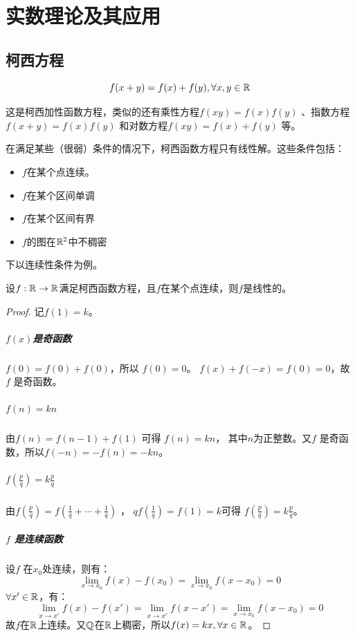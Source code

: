 \chapter{实数理论及其应用}

\section{柯西方程}
\begin{definition}[柯西函数方程]
    \[f(x+y)=f(x)+f(y), \forall x,y \in \mathbb{R}
    \]
\end{definition}

这是柯西加性函数方程，类似的还有乘性方程\(f(xy) = f(x)f(y)\) 、指数方程\(f(x+y) = f(x)f(y)\)
和对数方程\(f(xy) = f(x) + f(y)\) 等。

在满足某些（很弱）条件的情况下，柯西函数方程只有线性解。这些条件包括：
\begin{itemize}
    \item \(f\)在某个点连续。
    \item \(f\)在某个区间单调
    \item \(f\)在某个区间有界
    \item \(f\)的图在\(\mathbb{R}^2\)中不稠密
\end{itemize}

下以连续性条件为例。

\begin{theorem}
    设\(f:\mathbb{R} \to \mathbb{R}\)满足柯西函数方程，且\(f\)在某个点连续，则\(f\)是线性的。
\end{theorem}

\begin{proof}
    记\(f(1)=k\)。
    \paragraph*{\(f(x)\)是奇函数} \(f(0) = f(0) + f(0)\)，所以 \(f(0) = 0\)。
    \(f(x) + f(-x) = f(0) = 0\)，故\(f\) 是奇函数。
    \paragraph*{\(f(n)=kn\)} 由\(f(n) = f(n-1) + f(1)\) 可得 \(f(n) = kn\)，
    其中\(n\)为正整数。又\(f\) 是奇函数，所以\(f(-n) = -f(n) = -kn\)。
    \paragraph*{\(f\left( \frac{p}{q} \right) = k \frac{p}{q}\)}
    由\(f\left( \frac{p}{q} \right)
    = f\left( \frac{1}{q} + \cdots + \frac{1}{q} \right)\) ，
    \(qf\left( \frac{1}{q} \right)= f(1) = k\)可得
    \(f\left( \frac{p}{q} \right) = k
    \frac{p}{q}\)。
    \paragraph*{\(f\) 是连续函数} 设\(f\) 在\(x_0\)处连续，则有：\[
        \lim_{x \to x_0} f(x)-f(x_{0}) = \lim_{x \to x_0} f(x-x_0) =0
    \]
    \(\forall x' \in \mathbb{R}\)，有：\[
        \lim_{x \to x'} f(x)-f(x') = \lim_{x \to x'} f(x-x') =
        \lim_{x \to x_{0}} f(x-x_{0}) = 0
    \]
    故\(f\)在\(\mathbb{R}\)上连续。又\(\mathbb{Q}\)在\(\mathbb{R}\)上稠密，所以\(f(x) = kx, \forall x \in \mathbb{R}\)。
\end{proof}
